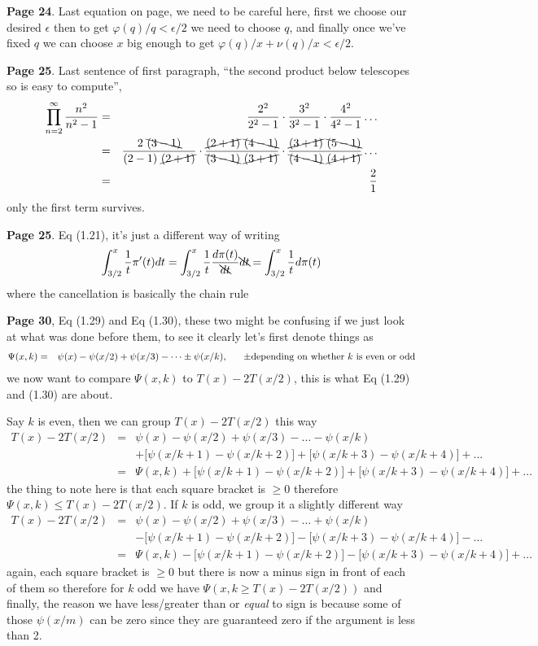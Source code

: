\documentclass[aps,preprint,preprintnumbers,nofootinbib,showpacs,prd]{revtex4-1}
\newcommand{\nbea}{\begin{eqnarray*}}
\newcommand{\neea}{\end{eqnarray*}}
\begin{document}
{\bf Page 24}. Last equation on page, we need to be careful here, first we choose our desired $\epsilon$ then to get $\varphi(q)/q < \epsilon/2$ we need to choose $q$, and finally once we've fixed $q$ we can choose $x$ big enough to get $\varphi(q)/x + \nu(q)/x < \epsilon/2$.

{\bf Page 25}. Last sentence of first paragraph, ``the second product below telescopes so is easy to compute'', 
%
\nbea
\prod_{n=2}^\infty \frac{n^2}{n^2 - 1} & = & \frac{2^2}{2^2-1} \cdot \frac{3^2}{3^2 - 1} \cdot \frac{4^2}{4^2 - 1} \dots \\
& = & \frac{2~\bcancel{(3-1)}}{(2-1)~\cancel{(2+1)}} \cdot \frac{\cancel{(2+1)}~\bcancel{(4-1)}}{\bcancel{(3 - 1)}~\cancel{(3 + 1)}} \cdot \frac{\cancel{(3+1)}~\bcancel{(5-1)}}{\bcancel{(4 - 1)}~\cancel{(4+1)}} \dots \\
& = & \frac{2}{1}
\neea
%
only the first term survives.

{\bf Page 25}. Eq (1.21), it's just a different way of writing
%
\nbea
\int_{3/2}^x \frac{1}{t} \pi'(t) dt = \int_{3/2}^x \frac{1}{t} \frac{d\pi(t)}{\bcancel{dt}} \bcancel{dt} = \int_{3/2}^x \frac{1}{t} d\pi(t)
\neea
%
where the cancellation is basically the chain rule

{\bf Page 30}, Eq (1.29) and Eq (1.30), these two might be confusing if we just look at what was done before them, to see it clearly let's first denote things as
%
\nbea
\Psi(x,k) & = & \psi(x) - \psi(x/2) + \psi(x/3) - \dots \pm \psi(x/k), ~~~~~ \pm {\rm depending~on~whether~} k ~{\rm is~even~or~odd}
\neea
%
we now want to compare $\Psi(x,k)$ to $T(x) - 2T(x/2)$, this is what Eq (1.29) and (1.30) are about.

Say $k$ is even, then we can group $T(x) - 2T(x/2)$ this way
%
\nbea
T(x) - 2T(x/2) & = & \psi(x) - \psi(x/2) + \psi(x/3) - \dots - \psi(x/k) \\
&& + \lbrack\psi(x/k+1) - \psi(x/k+2)\rbrack + \lbrack\psi(x/k+3) - \psi(x/k+4)\rbrack + \dots \\
& = & \Psi(x,k) + \lbrack\psi(x/k+1) - \psi(x/k+2)\rbrack + \lbrack\psi(x/k+3) - \psi(x/k+4)\rbrack + \dots
\neea
%
the thing to note here is that each square bracket is $\ge 0$ therefore $\Psi(x,k) \le T(x) - 2T(x/2)$. If $k$ is odd, we group it a slightly different way
%
\nbea
T(x) - 2T(x/2) & = & \psi(x) - \psi(x/2) + \psi(x/3) - \dots + \psi(x/k) \\
&& - \lbrack\psi(x/k+1) - \psi(x/k+2)\rbrack - \lbrack\psi(x/k+3) - \psi(x/k+4)\rbrack - \dots \\
& = & \Psi(x,k) - \lbrack\psi(x/k+1) - \psi(x/k+2)\rbrack - \lbrack\psi(x/k+3) - \psi(x/k+4)\rbrack + \dots
\neea
%
again, each square bracket is $\ge 0$ but there is now a minus sign in front of each of them so therefore for $k$ odd we have $\Psi(x,k \ge T(x) - 2T(x/2))$ and finally, the reason we have less/greater than or {\it equal} to sign is because some of those $\psi(x/m)$ can be zero since they are guaranteed zero if the argument is less than 2.
\end{document}
